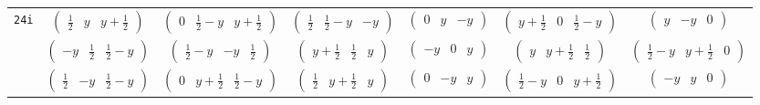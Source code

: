 \documentclass[fleqn,9pt,landscape]{jsarticle}
\begin{document}
\begin{center}
\begin{longtable}{ccccccc}
{\tt 24i} & $ \begin{pmatrix} \frac{1}{2} & y & y + \frac{1}{2} \end{pmatrix} $ & $ \begin{pmatrix} 0 & \frac{1}{2} - y & y + \frac{1}{2} \end{pmatrix} $ & $ \begin{pmatrix} \frac{1}{2} & \frac{1}{2} - y & - y \end{pmatrix} $ & $ \begin{pmatrix} 0 & y & - y \end{pmatrix} $ & $ \begin{pmatrix} y + \frac{1}{2} & 0 & \frac{1}{2} - y \end{pmatrix} $ & $ \begin{pmatrix} y & - y & 0 \end{pmatrix} $ \\
& $ \begin{pmatrix} - y & \frac{1}{2} & \frac{1}{2} - y \end{pmatrix} $ & $ \begin{pmatrix} \frac{1}{2} - y & - y & \frac{1}{2} \end{pmatrix} $ & $ \begin{pmatrix} y + \frac{1}{2} & \frac{1}{2} & y \end{pmatrix} $ & $ \begin{pmatrix} - y & 0 & y \end{pmatrix} $ & $ \begin{pmatrix} y & y + \frac{1}{2} & \frac{1}{2} \end{pmatrix} $ & $ \begin{pmatrix} \frac{1}{2} - y & y + \frac{1}{2} & 0 \end{pmatrix} $ \\
& $ \begin{pmatrix} \frac{1}{2} & - y & \frac{1}{2} - y \end{pmatrix} $ & $ \begin{pmatrix} 0 & y + \frac{1}{2} & \frac{1}{2} - y \end{pmatrix} $ & $ \begin{pmatrix} \frac{1}{2} & y + \frac{1}{2} & y \end{pmatrix} $ & $ \begin{pmatrix} 0 & - y & y \end{pmatrix} $ & $ \begin{pmatrix} \frac{1}{2} - y & 0 & y + \frac{1}{2} \end{pmatrix} $ & $ \begin{pmatrix} - y & y & 0 \end{pmatrix} $ \\

\end{longtable}
\end{center}
\end{document}
